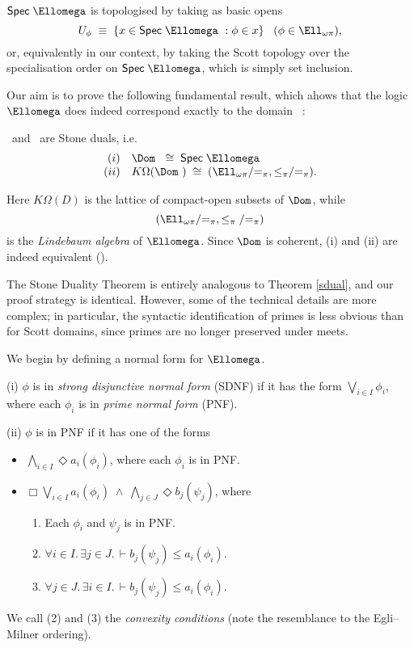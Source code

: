 ${\sf Spec} \; \Ellomega$ is topologised by taking as basic opens
\[ U_{\phi} \; \equiv \;  \{ x \in {\sf Spec} \; \Ellomega\ : \phi \in x \}
\;\;\; (\phi \in \Ell_{\omega \pi}) , \]
or, equivalently in our context, by taking the Scott topology over the
specialisation order on ${\sf Spec} \; \Ellomega$, which is simply set
inclusion.

Our aim is to prove the following fundamental result, which ahows that
the logic $\Ellomega$ does indeed correspond exactly to the domain 
\Dom\ :

\begin{theorem}
\label{bdual}
\Dom\ and \Ellomega\ are Stone duals, i.e.
\[ \begin{array}{rl}
(i) & \Dom\ \; \cong \; {\sf Spec} \; \Ellomega \\
(ii) & K \Omega (\Dom\ ) \; \cong \; (\Ell_{\omega \pi}/{=_{\pi}},
{\leq_{\pi}}/{=_{\pi}}) .
\end{array} \]
\end{theorem}





Here $K \Omega (D)$ is the lattice of compact-open subsets of $\Dom$, while 
\[ ( {\Ell}_{\omega \pi}/{=_{\pi}}, \leq_{\pi}/{=_{\pi}}) \]
is the {\em Lindebaum algebra} of $\Ellomega$. 
Since $\Dom$ is coherent, (i) and (ii) are indeed equivalent (\cite{Joh82}).

The Stone Duality Theorem is entirely analogous to Theorem \ref{sdual}, and our proof strategy is identical.
However, some of the technical details are more complex; in particular, the syntactic identification of primes is less obvious than for Scott domains, since primes are no longer preserved under meets.

We begin by defining a normal form for $\Ellomega$.
\begin{definition}
{\rm (i) $\phi$ is in {\em strong disjunctive normal form} (SDNF) if it has the form $\bigvee_{i \in I} \phi_{i}$, where each $\phi_{i}$ is in {\em prime normal form} (PNF).

\noindent (ii) $\phi$ is in PNF if it has one of the forms
\begin{itemize}
\item $\bigwedge_{i \in I} \Diamond a_{i} (\phi_{i})$, where each $\phi_{i}$ is in PNF.
\item $\Box \bigvee_{i \in I} a_{i} ( \phi_{i}) \; \wedge \; \bigwedge_{j \in J} \Diamond b_{j}(\psi_{j})$, where
\begin{enumerate}
\item Each $\phi_{i}$ and $\psi_{j}$ is in PNF.
\item $\forall i \in I. \, \exists j \in J. \, \vdash  b_{j}(\psi_{j}) \leq 
a_{i}(\phi_{i})$.
\item $\forall j \in J. \, \exists i \in I. \, \vdash  b_{j}(\psi_{j}) \leq 
a_{i}(\phi_{i})$.
\end{enumerate}
\end{itemize}}
\end{definition}
We call (2) and (3) the {\em convexity conditions} (note the resemblance to the Egli--Milner ordering).


